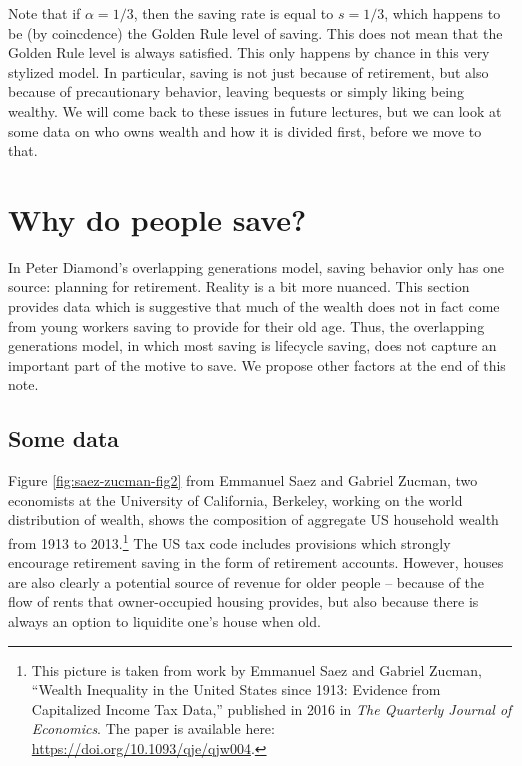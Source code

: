 \documentclass[]{book}
\let\rmarkdownfootnote\footnote%
\def\footnote{\protect\rmarkdownfootnote}
\theoremstyle{definition}
\theoremstyle{definition}
\theoremstyle{definition}
\theoremstyle{remark}
\begin{document}
Note that if \(\alpha=1/3\), then the saving rate is equal to
\(s = 1/3\), which happens to be (by coincdence) the Golden Rule level
of saving. This does not mean that the Golden Rule level is always
satisfied. This only happens by chance in this very stylized model. In
particular, saving is not just because of retirement, but also because
of precautionary behavior, leaving bequests or simply liking being
wealthy. We will come back to these issues in future lectures, but we
can look at some data on who owns wealth and how it is divided first,
before we move to that.

\section{Why do people save?}\label{why-do-people-save}

In Peter Diamond's overlapping generations model, saving behavior only
has one source: planning for retirement. Reality is a bit more nuanced.
This section provides data which is suggestive that much of the wealth
does not in fact come from young workers saving to provide for their old
age. Thus, the overlapping generations model, in which most saving is
lifecycle saving, does not capture an important part of the motive to
save. We propose other factors at the end of this note.

\subsection{Some data}\label{some-data-1}

Figure \ref{fig:saez-zucman-fig2} from Emmanuel Saez and Gabriel Zucman,
two economists at the University of California, Berkeley, working on the
world distribution of wealth, shows the composition of aggregate US
household wealth from 1913 to 2013.\footnote{This picture is taken from
  work by Emmanuel Saez and Gabriel Zucman, ``Wealth Inequality in the
  United States since 1913: Evidence from Capitalized Income Tax Data,''
  published in 2016 in \emph{The Quarterly Journal of Economics}. The
  paper is available here: \url{https://doi.org/10.1093/qje/qjw004}.}
The US tax code includes provisions which strongly encourage retirement
saving in the form of retirement accounts. However, houses are also
clearly a potential source of revenue for older people -- because of the
flow of rents that owner-occupied housing provides, but also because
there is always an option to liquidite one's house when old.
\end{document}
